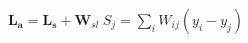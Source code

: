 \documentclass[preview]{standalone}
\begin{document}
\begin{align*}
\mathbf{ L_a } = \mathbf{L_s} + \mathbf{W}_{sl} \  S_j  = \sum_i W_{ij}(y_i - y_j)
\end{align*}
\end{document}
